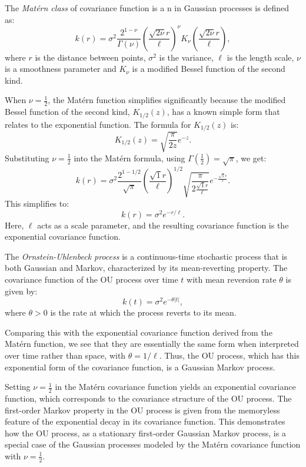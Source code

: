 \documentclass[
11pt, %
oneside, %
english, %
singlespacing, %
]{macthesis} %
\begin{document}
The \emph{Matérn class} of covariance function is a n in Gaussian processes is defined as:
\[
k(r) = \sigma^2 \frac{2^{1-\nu}}{\Gamma(\nu)}\left(\frac{\sqrt{2\nu} r}{\ell}\right)^\nu K_\nu\left(\frac{\sqrt{2\nu} r}{\ell}\right),
\]
where \(r\) is the distance between points, \(\sigma^2\) is the variance, \(\ell\) is the length scale, \(\nu\) is a smoothness parameter and \(K_\nu\) is a modified Bessel function of the second kind.

When \(\nu = \frac{1}{2}\), the Matérn function simplifies significantly because the modified Bessel function of the second kind, \(K_{1/2}(z)\), has a known simple form that relates to the exponential function. The formula for \(K_{1/2}(z)\) is:
\[
K_{1/2}(z) = \sqrt{\frac{\pi}{2z}} e^{-z}.
\]
Substituting \(\nu = \frac{1}{2}\) into the Matérn formula, using \(\Gamma(\frac{1}{2}) = \sqrt{\pi}\), we get:
\[
k(r) = \sigma^2 \frac{2^{1-1/2}}{\sqrt{\pi}}\left(\frac{\sqrt{1} r}{\ell}\right)^{1/2} \sqrt{\frac{\pi}{2 \frac{\sqrt{1} r}{\ell}}} e^{-\frac{\sqrt{1} r}{\ell}}.
\]
This simplifies to:
\[
k(r) = \sigma^2 e^{-r/\ell}.
\]
Here, \(\ell\) acts as a scale parameter, and the resulting covariance function is the exponential covariance function.

The \emph{Ornstein-Uhlenbeck process} is a continuous-time stochastic process that is both Gaussian and Markov, characterized by its mean-reverting property. The covariance function of the OU process over time \(t\) with mean reversion rate \(\theta\) is given by:
\[
k(t) = \sigma^2 e^{-\theta |t|},
\]
where \(\theta > 0\) is the rate at which the process reverts to its mean.

Comparing this with the exponential covariance function derived from the Matérn function, we see that they are essentially the same form when interpreted over time rather than space, with \(\theta = 1/\ell\). Thus, the OU process, which has this exponential form of the covariance function, is a Gaussian Markov process.

Setting \(\nu = \frac{1}{2}\) in the Matérn covariance function yields an exponential covariance function, which corresponds to the covariance structure of the OU process. The first-order Markov property in the OU process is given from the memoryless feature of the exponential decay in its covariance function. This demonstrates how the OU process, as a stationary first-order Gaussian Markov process, is a special case of the Gaussian processes modeled by the Matérn covariance function with \(\nu = \frac{1}{2}\).
\end{document}
